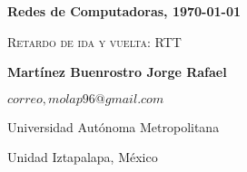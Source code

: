 \documentclass[letterpaper,11pt,twoside]{report}
\date{}
\begin{document}
	\centerline{\bf Redes de Computadoras, \today}
	\centerline{}
	\begin{center}
		\Large{\textsc{Retardo de ida y vuelta: RTT}}
	\end{center}
	
	\centerline{}
	\centerline{\textbf{Martínez Buenrostro Jorge Rafael}}
	\centerline{}
	
	\centerline{$correo, molap96@gmail.com$}
	
        \centerline{Universidad Aut\'onoma Metropolitana} 
	\centerline{Unidad Iztapalapa, M\'exico}
	
	\bigskip
	
    
\end{document}
